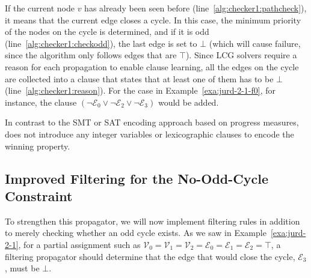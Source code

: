 \documentclass[a4paper,UKenglish,cleveref, autoref, thm-restate, anonymous]{lipics-v2021}
\begin{document}
If the current node $v$ has already been seen before (line~\ref{alg:checker1:pathcheck}), it means that the current edge closes a cycle. In this case, the minimum priority of the nodes on the cycle is determined, and if it is odd (line~\ref{alg:checker1:checkodd}), the last edge is set to $\bot$ (which will cause failure, since the algorithm only follows edges that are $\top$). Since LCG solvers require a reason for each propagation to enable clause learning, all the edges on the cycle are collected into a clause that states that at least one of them has to be $\bot$ (line~\ref{alg:checker1:reason}). For the case in Example~\ref{exa:jurd-2-1-f0}, for instance, the clause $(\neg \mathcal{E}_0 \vee \neg \mathcal{E}_2 \vee \neg \mathcal{E}_3)$ would be added.

In contrast to the SMT or SAT encoding approach based on progress measures, \noc does not introduce any integer variables or lexicographic clauses to encode the winning property.

\subsection{Improved Filtering for the No-Odd-Cycle Constraint}
\label{sec:improved}
To strengthen this propagator, we will now implement filtering rules in addition to merely checking whether an odd cycle exists. As we saw in Example~\ref{exa:jurd-2-1}, for a partial assignment such as $\mathcal{V}_0 = \mathcal{V}_1 = \mathcal{V}_2 = \mathcal{E}_0 = \mathcal{E}_1 = \mathcal{E}_2 = \top$, a filtering propagator should determine that the edge that would close the cycle, $\mathcal{E}_3$, must be $\bot$.



\end{document}

